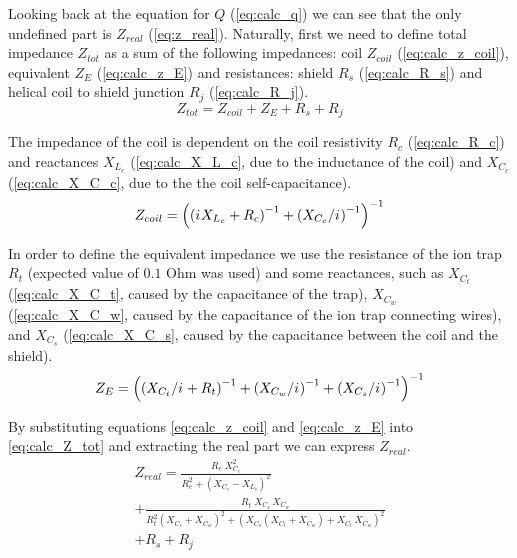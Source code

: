 Looking back at the equation for $Q$ (\ref{eq:calc_q}) we can see that the only undefined part is $Z_{real}$ (\ref{eq:z_real}). Naturally, first we need to define total impedance $Z_{tot}$ as a sum of the following impedances: coil $Z_{coil}$ (\ref{eq:calc_z_coil}), equivalent $Z_E$ (\ref{eq:calc_z_E}) and resistances: shield $R_s$ (\ref{eq:calc_R_s}) and helical coil to shield junction $R_j$ (\ref{eq:calc_R_j}).
\begin{equation}
	Z_{tot} = Z_{coil} + Z_E + R_s + R_j
	\label{eq:calc_Z_tot}
\end{equation}

The impedance of the coil is dependent on the coil resistivity $R_c$ (\ref{eq:calc_R_c}) and reactances $X_{L_c}$ (\ref{eq:calc_X_L_c}, due to the inductance of the coil) and $X_{C_c}$ (\ref{eq:calc_X_C_c}, due to the the coil self-capacitance).
\begin{equation}
	Z_{coil} = \left( \left( {i\mkern1mu} X_{L_c} + R_c \right)^{-1} + \left( X_{C_c} / {i\mkern1mu} \right)^{-1} \right)^{-1}
	\label{eq:calc_z_coil}
\end{equation}

In order to define the equivalent impedance we use the resistance of the ion trap $R_t$ (expected value of $0.1$ Ohm was used) and some reactances, such as $X_{C_t}$ (\ref{eq:calc_X_C_t}, caused by the capacitance of the trap), $X_{C_w}$ (\ref{eq:calc_X_C_w}, caused by the capacitance of the ion trap connecting wires), and $X_{C_s}$ (\ref{eq:calc_X_C_s}, caused by the capacitance between the coil and the shield).
\begin{equation}
	Z_E = \left(  \left( X_{C_t}/{i\mkern1mu} + R_t \right)^{-1} + \left( X_{C_w}/{i\mkern1mu} \right)^{-1} + \left( X_{C_s}/{i\mkern1mu} \right)^{-1} \right)^{-1}
	\label{eq:calc_z_E}
\end{equation}

By substituting equations \ref{eq:calc_z_coil} and \ref{eq:calc_z_E} into \ref{eq:calc_Z_tot} and extracting the real part we can express $Z_{real}$.
\begin{multline}
	Z_{real} = \frac{R_c \; X^2_{C_c}}{R^2_c + \left( X_{C_c} - X_{L_c} \right)^2}\\ 
	+ \frac{R_t \; X_{C_s} \, X_{C_w}}{R^2_t \left( X_{C_s} + X_{C_w} \right)^2 + \left( X_{C_s} \left( X_{C_t} + X_{C_w} \right) + X_{C_t} \, X_{C_w} \right)^2}\\
	+ R_s + R_j
	\label{eq:z_real}
\end{multline}

